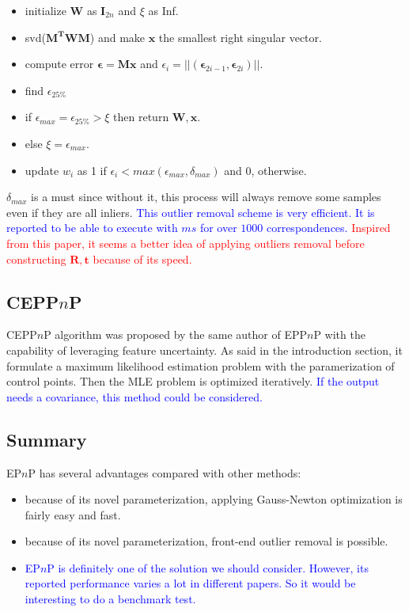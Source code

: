 \documentclass[a4paper]{report}
\begin{document}
\begin{itemize}
	\item initialize $\mathbf{W}$ as $\mathbf{I}_{2n}$ and $\xi$ as Inf.
	\item svd($\mathbf{M^TWM}$) and make $\mathbf{x}$ the smallest right singular vector.
	\item compute error $\mathbf{\epsilon}=\mathbf{Mx}$ and $\epsilon_i=||(\mathbf{\epsilon}_{2i-1}, \mathbf{\epsilon}_{2i})||$.
	\item find $\epsilon_{25\%}$
	\item if $\epsilon_{max}=\epsilon_{25\%}>\xi$ then return $\mathbf{W,x}$.
	\item else $\xi=\epsilon_{max}$.
	\item update $w_i$ as 1 if $\epsilon_i < max(\epsilon_{max}, \delta_{max})$ and 0, otherwise.
\end{itemize}
$\delta_{max}$ is a must since without it, this process will always remove some samples even if they are all inliers. \textcolor{blue}{This outlier removal scheme is very efficient. It is reported to be able to execute with $ms$ for over $1000$ correspondences.} \textcolor{red}{Inspired from this paper, it seems a better idea of applying outliers removal before constructing $\mathbf{R,t}$ because of its speed.}

\subsection{CEPP$n$P}
CEPP$n$P algorithm was proposed by the same author of EPP$n$P with the capability of leveraging feature uncertainty. As said in the introduction section, it formulate a maximum likelihood estimation problem with the paramerization of control points. Then the MLE problem is optimized iteratively. \textcolor{blue}{If the output needs a covariance, this method could be considered.}

\subsection{Summary}
EP$n$P has several advantages compared with other methods:
\begin{itemize}
	\item because of its novel parameterization, applying Gauss-Newton optimization is fairly easy and fast.
	\item because of its novel parameterization, front-end outlier removal is possible.
	\item \textcolor{blue}{EP$n$P is definitely one of the solution we should consider. However, its reported performance varies a lot in different papers. So it would be interesting to do a benchmark test.}
\end{itemize}
\end{document}
